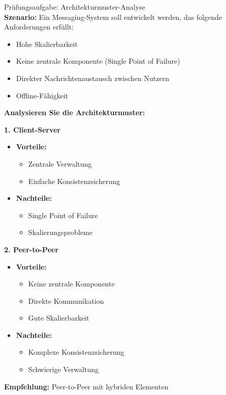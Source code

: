 \begin{example2}{Prüfungsaufgabe: Architekturmuster-Analyse}\\
\textbf{Szenario:}
Ein Messaging-System soll entwickelt werden, das folgende Anforderungen erfüllt:
\begin{itemize}
    \item Hohe Skalierbarkeit
    \item Keine zentrale Komponente (Single Point of Failure)
    \item Direkter Nachrichtenaustausch zwischen Nutzern
    \item Offline-Fähigkeit
\end{itemize}

\textbf{Analysieren Sie die Architekturmuster:}

\textbf{1. Client-Server}
\begin{itemize}
    \item \textbf{Vorteile:}
    \begin{itemize}
        \item Zentrale Verwaltung
        \item Einfache Konsistenzsicherung
    \end{itemize}
    \item \textbf{Nachteile:}
    \begin{itemize}
        \item Single Point of Failure
        \item Skalierungsprobleme
    \end{itemize}
\end{itemize}

\textbf{2. Peer-to-Peer}
\begin{itemize}
    \item \textbf{Vorteile:}
    \begin{itemize}
        \item Keine zentrale Komponente
        \item Direkte Kommunikation
        \item Gute Skalierbarkeit
    \end{itemize}
    \item \textbf{Nachteile:}
    \begin{itemize}
        \item Komplexe Konsistenzsicherung
        \item Schwierige Verwaltung
    \end{itemize}
\end{itemize}

\textbf{Empfehlung:} Peer-to-Peer mit hybriden Elementen
\end{example2}


